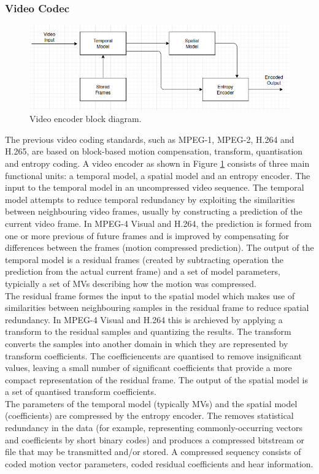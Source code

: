 \subsubsection{Video Codec}
\begin{figure}
\centering
 \includegraphics[width=0.8\linewidth]{Figures/encoder.png}
 \caption{Video encoder block diagram.}
 \label{fig:encoder}
\end{figure}
The previous video coding standards, such as MPEG-1, MPEG-2, H.264 and H.265, are based on block-based motion compensation, transform, quantisation and entropy coding. A video encoder as shown in Figure \ref{fig:encoder} consists of three main functional units: a temporal model, a spatial model and an entropy encoder. The input to the temporal model in an uncompressed video sequence. The temporal model attempts to reduce temporal redundancy by exploiting the similarities between neighbouring video frames, usually by constructing a prediction of the current video frame. In MPEG-4 Visual and H.264, the prediction is formed from one or more previous of future frames and is improved by compensating for differences between the frames (motion compressed prediction). The output of the temporal model is a residual frames (created by subtracting operation the prediction from the actual current frame) and a set of model parameters, typicially a set of MVs describing how the motion was compressed. \\
The residual frame formes the input to the spatial model which makes use of similarities between neighbouring samples in the residual frame to reduce spatial redundancy. In MPEG-4 Visual and H.264 this is archieved by applying a transform to the residual samples and quantizing the results. The transform converts the samples into another domain in which they are represented by transform coefficients. The coefficiencents are quantised to remove insignificant values, leaving a small number of significant coefficients that provide a more compact representation of the residual frame. The output of the spatial model is a set of quantised transform coefficients.\\
The parameters of the temporal model (typically MVs) and the spatial model (coefficients) are compressed by the entropy encoder. The removes statistical redundancy in the data (for example, representing commonly-occurring  vectors and coefficients by short binary codes) and produces a compressed bitstream or file that may be transmitted and/or stored. A compressed sequency consists of coded motion vector parameters, coded residual coefficients and hear information.\\

